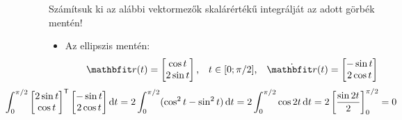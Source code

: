 \documentclass[exercise]{math-standalone}
\begin{document}
\begin{exercise}{Számítsuk ki az alábbi vektormezők skalárértékű integrálját az adott görbék mentén!}
{\begin{enumerate}[a)]
\begin{itemize}[i)]
              \item Az ellipszis mentén:
                    \[
                      \rvec r(t) = \begin{bmatrix}
                        \cos t \\ 2 \sin t
                      \end{bmatrix}
                      \text,\quad
                      t \in [0; \pi/2]
                      \text,\quad
                      \dot{\rvec r}(t) = \begin{bmatrix}
                        - \sin t \\ 2 \cos t
                      \end{bmatrix}
                    \]
                    \[
                      \hspace{-2.25cm}
                      \int_0^{\pi / 2} \begin{bmatrix}
                        2 \sin t \\ \cos t
                      \end{bmatrix}^\transpose
                      \begin{bmatrix}
                        - \sin t \\ 2 \cos t
                      \end{bmatrix}
                      \diff t
                      = 2 \int_0^{\pi / 2} (\cos^2 t - \sin^2 t) \, \diff t
                      = 2 \int_0^{\pi / 2} \cos 2t \, \diff t
                      = 2 \left[ \frac{\sin 2t}{2} \right]_0^{\pi / 2}
                      = 0
                    \]
            \end{itemize}
    \end{enumerate}
  }
\end{exercise}
\end{document}
